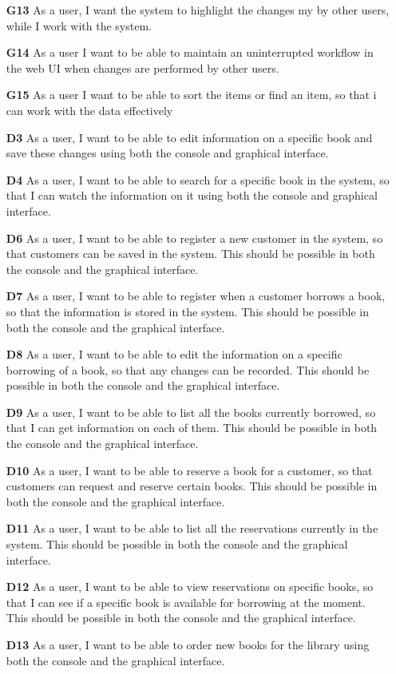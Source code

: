 \begin{itemize}
  \item [\textbf{G13}] As a user, I want the system to highlight the changes my by other users, while I work with the system.
  \item [\textbf{G14}] As a user I want to be able to maintain an uninterrupted workflow in the web UI when changes are performed by other users.
  \item [\textbf{G15}] As a user I want to be able to sort the items or find an item, so that i can work with the data effectively
  \item [\textbf{D3}] As a user, I want to be able to edit information on a specific book and save these changes using both the console and graphical interface.
  \item [\textbf{D4}] As a user, I want to be able to search for a specific book in the system, so that I can watch the information on it using both the console and graphical interface.
  \item [\textbf{D6}] As a user, I want to be able to register a new customer in the system, so that customers can be saved in the system. This should be possible in both the console and the graphical interface.
  \item [\textbf{D7}] As a user, I want to be able to register when a customer borrows a book, so that the information is stored in the system. This should be possible in both the console and the graphical interface.
  \item [\textbf{D8}] As a user, I want to be able to edit the information on a specific borrowing of a book, so that any changes can be recorded. This should be possible in both the console and the graphical interface.
  \item [\textbf{D9}] As a user, I want to be able to list all the books currently borrowed, so that I can get information on each of them. This should be possible in both the console and the graphical interface.
  \item [\textbf{D10}] As a user, I want to be able to reserve a book for a customer, so that customers can request and reserve certain books. This should be possible in both the console and the graphical interface.
  \item [\textbf{D11}] As a user, I want to be able to list all the reservations currently in the system. This should be possible in both the console and the graphical interface.
  \item [\textbf{D12}] As a user, I want to be able to view reservations on specific books, so that I can see if a specific book is available for borrowing at the moment. This should be possible in both the console and the graphical interface.
  \item [\textbf{D13}] As a user, I want to be able to order new books for the library using both the console and the graphical interface.
\end{itemize}

